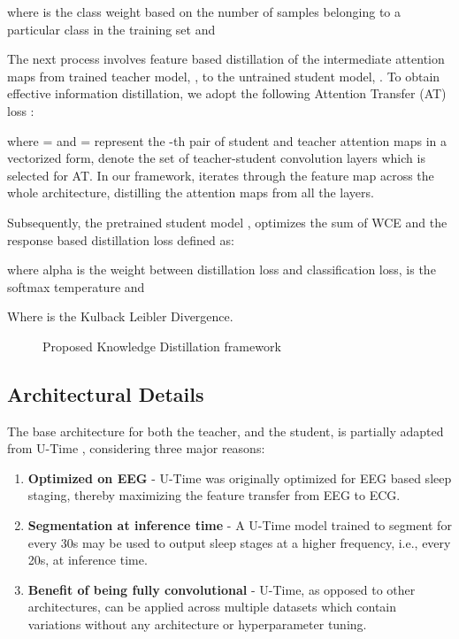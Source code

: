 \documentclass[letterpaper, 10 pt, conference]{ieeeconf}
\begin{document}
where  is the class weight based on the number of samples belonging to a particular class in the training set and



The next process involves feature based distillation of the intermediate attention maps from trained teacher model, , to the untrained student model, . To obtain effective information distillation, we adopt the following Attention Transfer (AT) loss \cite{komodakis2017paying}:



where = and = represent the -th pair of student and teacher attention maps in a vectorized form,  denote the set of teacher-student convolution layers which is selected for AT. In our framework,  iterates through the feature map across the whole architecture, distilling the attention maps from all the layers. 

Subsequently, the pretrained student model , optimizes the sum of WCE and the response based distillation loss defined as:



where alpha is the weight between distillation loss and classification loss,  is the softmax temperature and   






Where  is the Kulback Leibler Divergence.

\begin{figure}[t]
    \centering
    
    \caption{Proposed Knowledge Distillation framework}
    \label{fig:1}
\vspace{-1.2em}
\end{figure}

\subsection{Architectural Details}

The base architecture for both the teacher,  and the student,  is partially adapted from U-Time \cite{perslev2019u}, considering three major reasons:
\begin{enumerate}
    \item  \textbf{Optimized on EEG} - U-Time was originally optimized for EEG based sleep staging, thereby maximizing the feature transfer from EEG to ECG.
    \item  \textbf{Segmentation at inference time} - A U-Time model trained to segment for every 30s may be used to output sleep stages at a higher frequency, i.e., every 20s, at inference time.
   \item \textbf{Benefit of being fully convolutional} - U-Time, as opposed to other architectures, can be applied across multiple datasets which contain variations without any architecture or hyperparameter tuning.
\end{enumerate}
\end{document}
